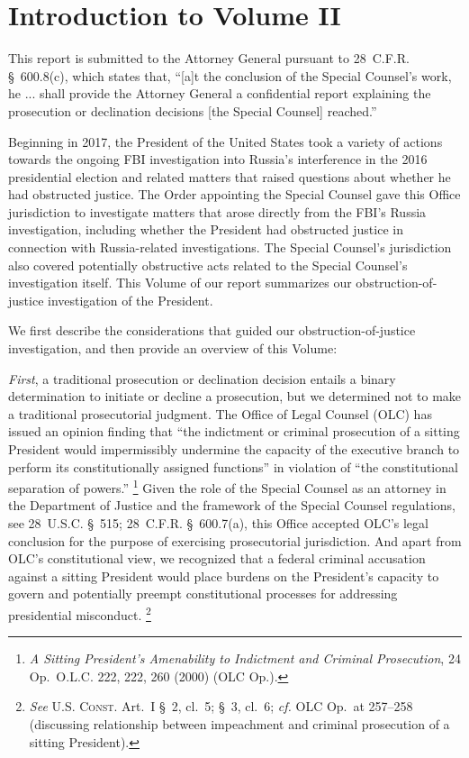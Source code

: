 \section*{Introduction to Volume II}
\label{sec:introduction-2}

This report is submitted to the Attorney General pursuant to 28~C.F.R. \S~600.8(c), which states that, “[a]t the conclusion of the Special Counsel’s work, he ... shall provide the Attorney General a confidential report explaining the prosecution or declination decisions [the Special Counsel] reached.”

Beginning in 2017, the President of the United States took a variety of actions towards the ongoing FBI investigation into Russia’s interference in the 2016 presidential election and related matters that raised questions about whether he had obstructed justice.
The Order appointing the Special Counsel gave this Office jurisdiction to investigate matters that arose directly from the FBI’s Russia investigation, including whether the President had obstructed justice in connection with Russia-related investigations.
The Special Counsel’s jurisdiction also covered potentially obstructive acts related to the Special Counsel’s investigation itself.
This Volume of our report summarizes our obstruction-of-justice investigation of the President.

We first describe the considerations that guided our obstruction-of-justice investigation, and then provide an overview of this Volume:

\textit{First}, a traditional prosecution or declination decision entails a binary determination to initiate or decline a prosecution, but we determined not to make a traditional prosecutorial judgment.
The Office of Legal Counsel (OLC) has issued an opinion finding that “the indictment or criminal prosecution of a sitting President would impermissibly undermine the capacity of the executive branch to perform its constitutionally assigned functions” in violation of “the constitutional separation of powers.”%
\footnote{\textit{A Sitting President’s Amenability to Indictment and Criminal Prosecution}, 24 Op.\ O.L.C. 222, 222, 260 (2000) (OLC Op.).}
Given the role of the Special Counsel as an attorney in the Department of Justice and the framework of the Special Counsel regulations, see 28~U.S.C. \S~515; 28~C.F.R. \S~600.7(a), this Office accepted OLC’s legal conclusion for the purpose of exercising prosecutorial jurisdiction.
And apart from OLC’s constitutional view, we recognized that a federal criminal accusation against a sitting President would place burdens on the President’s capacity to govern and potentially preempt constitutional processes for addressing presidential misconduct.%
\footnote{\textit{See} \textsc{U.S. Const.} Art.~I \S~2, cl.~5; \S~3, cl.~6; \textit{cf.} OLC Op.\ at 257--258 (discussing relationship between impeachment and criminal prosecution of a sitting President).}

